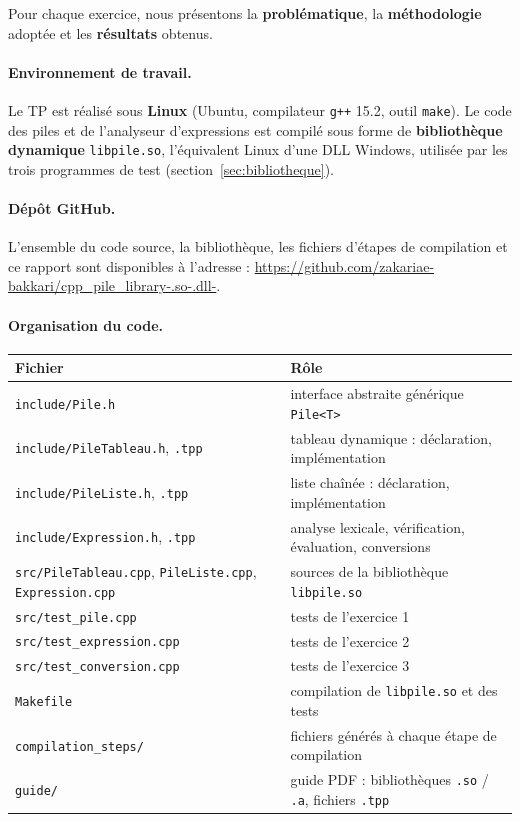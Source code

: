 \documentclass[11pt,a4paper]{article}
\newcommand{\code}[1]{\texttt{#1}}
\begin{document}
Pour chaque exercice, nous présentons la \textbf{problématique}, la
\textbf{méthodologie} adoptée et les \textbf{résultats} obtenus.

\paragraph{Environnement de travail.} Le TP est réalisé sous \textbf{Linux}
(Ubuntu, compilateur \code{g++} 15.2, outil \code{make}). Le code des piles
et de l'analyseur d'expressions est compilé sous forme de
\textbf{bibliothèque dynamique} \code{libpile.so}, l'équivalent Linux d'une
DLL Windows, utilisée par les trois programmes de test
(section~\ref{sec:bibliotheque}).

\paragraph{Dépôt GitHub.} L'ensemble du code source, la bibliothèque, les
fichiers d'étapes de compilation et ce rapport sont disponibles à
l'adresse : \url{https://github.com/zakariae-bakkari/cpp_pile_library-.so-.dll-}.

\paragraph{Organisation du code.}
\begin{center}
\small
\begin{tabular}{ll}
  \toprule
  \textbf{Fichier} & \textbf{Rôle} \\
  \midrule
  \code{include/Pile.h}        & interface abstraite générique \code{Pile<T>} \\
  \code{include/PileTableau.h}, \code{.tpp} & tableau dynamique : déclaration, implémentation \\
  \code{include/PileListe.h}, \code{.tpp}   & liste chaînée : déclaration, implémentation \\
  \code{include/Expression.h}, \code{.tpp}  & analyse lexicale, vérification, évaluation, conversions \\
  \code{src/PileTableau.cpp}, \code{PileListe.cpp}, \code{Expression.cpp}
                               & sources de la bibliothèque \code{libpile.so} \\
  \code{src/test\_pile.cpp}       & tests de l'exercice 1 \\
  \code{src/test\_expression.cpp} & tests de l'exercice 2 \\
  \code{src/test\_conversion.cpp} & tests de l'exercice 3 \\
  \code{Makefile}              & compilation de \code{libpile.so} et des tests \\
  \code{compilation\_steps/}   & fichiers générés à chaque étape de compilation \\
  \code{guide/}                & guide PDF : bibliothèques \code{.so} / \code{.a}, fichiers \code{.tpp} \\
  \bottomrule
\end{tabular}
\end{center}
\end{document}
